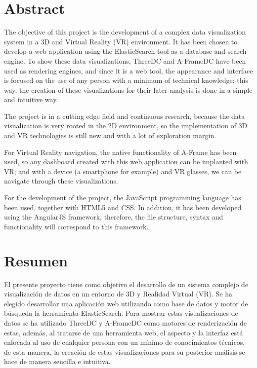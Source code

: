 \documentclass[a4paper, 12pt]{book}
\begin{document}
\chapter*{Abstract}
The objective of this project is the development of a complex data visualization system in a 3D and Virtual Reality (VR) environment. It has been chosen to develop a web application using the ElasticSearch tool as a database and search engine. To show these data visualizations, ThreeDC and A-FrameDC have been used as rendering engines, and since it is a web tool, the appearance and interface is focused on the use of any person with a minimum of technical knowledge; this way, the creation of these visualizations for their later analysis is done in a simple and intuitive way.

The project is in a cutting edge field and continuous research, because the data visualization is very rooted in the 2D environment, so the implementation of 3D and VR technologies is still new and with a lot of exploration margin.

For Virtual Reality navigation, the native functionality of A-Frame has been used, so any dashboard created with this web application can be implanted with VR; and with a device (a smartphone for example) and VR glasses, we can be navigate through these visualizations.

For the development of the project, the JavaScript programming language has been used, together with HTML5 and CSS. In addition, it has been developed using the AngularJS framework, therefore, the file structure, syntax and functionality will correspond to this framework.


\chapter*{Resumen}

El presente proyecto tiene como objetivo el desarrollo de un sistema complejo de visualización de datos en un entorno de 3D y Realidad Virtual (VR). Se ha elegido desarrollar una aplicación web utilizando como base de datos y motor de búsqueda la herramienta ElasticSearch. Para mostrar estas visualizaciones de datos se ha utilizado ThreeDC y A-FrameDC como motores de renderización de estas, además, al tratarse de una herramienta web, el aspecto y la interfaz está enfocada al uso de cualquier persona con un mínimo de conocimientos técnicos, de esta manera, la creación de estas visualizaciones para su posterior análisis se hace de manera sencilla e intuitiva.
\end{document}
